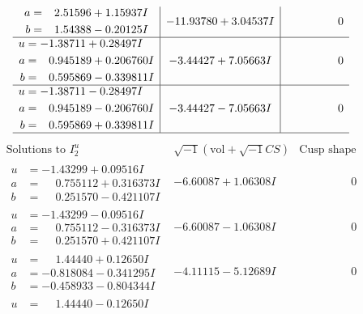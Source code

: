 \documentclass[1p]{elsarticle_modified}
\theoremstyle{definition}
\newcommand{\I}{\sqrt{-1}}
\begin{document}
$$\begin{array}{c|c|c}
\begin{aligned}
a &= \phantom{-}2.51596 + 1.15937 I \\
b &= \phantom{-}1.54388 - 0.20125 I\end{aligned}
 & -11.93780 + 3.04537 I & \phantom{-0.000000 } 0 \\ \hline\begin{aligned}
u &= -1.38711 + 0.28497 I \\
a &= \phantom{-}0.945189 + 0.206760 I \\
b &= \phantom{-}0.595869 - 0.339811 I\end{aligned}
 & -3.44427 + 7.05663 I & \phantom{-0.000000 } 0 \\ \hline\begin{aligned}
u &= -1.38711 - 0.28497 I \\
a &= \phantom{-}0.945189 - 0.206760 I \\
b &= \phantom{-}0.595869 + 0.339811 I\end{aligned}
 & -3.44427 - 7.05663 I & \phantom{-0.000000 } 0\\
 \hline 
 \end{array}$$\newpage$$\begin{array}{c|c|c}  
\text{Solutions to }I^u_{2}& \I (\text{vol} + \sqrt{-1}CS) & \text{Cusp shape}\\
 \hline 
\begin{aligned}
u &= -1.43299 + 0.09516 I \\
a &= \phantom{-}0.755112 + 0.316373 I \\
b &= \phantom{-}0.251570 - 0.421107 I\end{aligned}
 & -6.60087 + 1.06308 I & \phantom{-0.000000 } 0 \\ \hline\begin{aligned}
u &= -1.43299 - 0.09516 I \\
a &= \phantom{-}0.755112 - 0.316373 I \\
b &= \phantom{-}0.251570 + 0.421107 I\end{aligned}
 & -6.60087 - 1.06308 I & \phantom{-0.000000 } 0 \\ \hline\begin{aligned}
u &= \phantom{-}1.44440 + 0.12650 I \\
a &= -0.818084 - 0.341295 I \\
b &= -0.458933 - 0.804344 I\end{aligned}
 & -4.11115 - 5.12689 I & \phantom{-0.000000 } 0 \\ \hline\begin{aligned}
u &= \phantom{-}1.44440 - 0.12650 I \\

\end{aligned}
\end{array}$$
\end{document}
